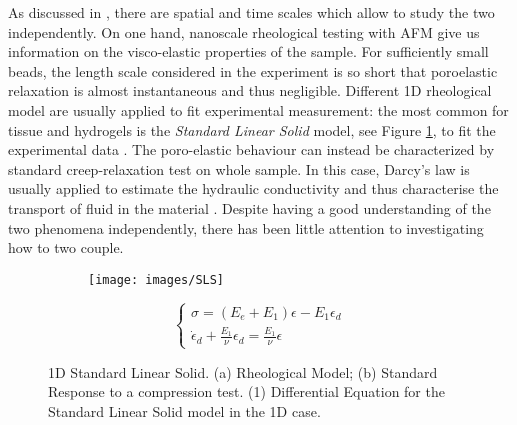 As discussed in \cite{viscoporo}, there are spatial and time scales which allow to study the two independently. On one hand, nanoscale rheological testing with AFM give us information on the visco-elastic properties of the sample. For sufficiently small beads, the length scale considered in the experiment is so short that poroelastic relaxation is almost instantaneous and thus negligible. Different 1D rheological model are usually applied to fit experimental measurement: the most common for tissue and hydrogels is the \textit{Standard Linear Solid} model, see Figure \ref{SLS}, to fit the experimental data \cite{Article1,viscoporo}. The poro-elastic behaviour can instead be characterized by standard creep-relaxation test on whole sample. In this case, Darcy's law is usually applied to estimate the hydraulic conductivity and thus characterise the transport of fluid in the material \cite{Netti,viscoporo}. Despite having a good understanding of the two phenomena independently, there has been little attention to investigating how to two couple.
\begin{figure}
	\begin{subfigure}{0.45\textwidth}
		\centering 
		\def\svgwidth{1.3\linewidth}
		
		\caption{}
	\end{subfigure}
	\begin{subfigure}{0.45\textwidth}
	\centering
	\texttt{[image: images/SLS]}\qquad 
	\caption{}
	\end{subfigure}

\vspace{5mm}
\begin{equation}
\begin{cases}
\sigma = (E_e+E_1)\epsilon-E_1\epsilon_d\\
\dot{\epsilon}_d + \frac{E_1}{\nu} \epsilon_d = \frac{E_1}{\nu} \epsilon
\end{cases}
\tag{SLS}
\end{equation}
\vspace{3mm}
\caption{1D Standard Linear Solid. (a) Rheological Model; (b) Standard Response to a compression test. (1) Differential Equation for the Standard Linear Solid model in the 1D case.}
\label{SLS}
\end{figure}

